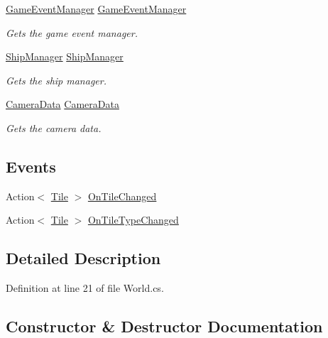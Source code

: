 \begin{DoxyCompactItemize}
\hyperlink{class_game_event_manager}{Game\+Event\+Manager} \hyperlink{class_world_ace6c6d4a5ea86e39c20c6ad9cd573d08}{Game\+Event\+Manager}
\begin{DoxyCompactList}\small\item\em Gets the game event manager. \end{DoxyCompactList}\item 
\hyperlink{class_ship_manager}{Ship\+Manager} \hyperlink{class_world_a74a18f145ecbf627f2dccb454e06be43}{Ship\+Manager}
\begin{DoxyCompactList}\small\item\em Gets the ship manager. \end{DoxyCompactList}\item 
\hyperlink{class_camera_data}{Camera\+Data} \hyperlink{class_world_ac0dc8730938f32a2e69ad943a71cb34d}{Camera\+Data}
\begin{DoxyCompactList}\small\item\em Gets the camera data. \end{DoxyCompactList}\end{DoxyCompactItemize}
\subsection*{Events}
\begin{DoxyCompactItemize}
\item 
Action$<$ \hyperlink{class_tile}{Tile} $>$ \hyperlink{class_world_adbd4a4649f58585850e61318f28647f8}{On\+Tile\+Changed}
\item 
Action$<$ \hyperlink{class_tile}{Tile} $>$ \hyperlink{class_world_a9bb57a09d4ab53f9c69117402509772a}{On\+Tile\+Type\+Changed}
\end{DoxyCompactItemize}


\subsection{Detailed Description}


Definition at line 21 of file World.\+cs.



\subsection{Constructor \& Destructor Documentation}
\mbox{\label{class_world_a4ec5a28e3d60acbe09b6bc266803007a}} 
